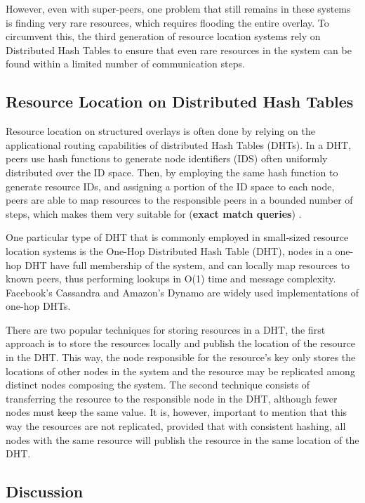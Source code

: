However, even with super-peers, one problem that still remains in these systems is finding very rare resources, which requires flooding the entire overlay. To circumvent this, the third generation of resource location systems rely on Distributed Hash Tables to ensure that even rare resources in the system can be found within a limited number of communication steps.

\subsection{Resource Location on Distributed Hash Tables}

Resource location on structured overlays is often done by relying on the applicational routing capabilities of distributed Hash Tables (DHTs). In a DHT, peers use hash functions to generate node identifiers (IDS) often uniformly distributed over the ID space. Then, by employing the same hash function to generate resource IDs, and assigning a portion of the ID space to each node, peers are able to map resources to the responsible peers in a bounded number of steps, which makes them very suitable for (\textbf{exact match queries}) \cite{leitaoPHDthesis}. 

One particular type of DHT that is commonly employed in small-sized resource location systems is the One-Hop Distributed Hash Table (DHT), nodes in a one-hop DHT have full membership of the system, and can locally map resources to known peers, thus performing lookups in O(1) time and message complexity. Facebook's Cassandra \cite{lakshman2010cassandra} and Amazon's Dynamo \cite{decandia2007dynamo} are widely used implementations of one-hop DHTs. 

There are two popular techniques for storing resources in a DHT, the first approach is to store the resources locally and publish the location of the resource in the DHT. This way, the node responsible for the resource's key only stores the locations of other nodes in the system and the resource may be replicated among distinct nodes composing the system. The second technique consists of transferring the resource to the responsible node in the DHT, although fewer nodes must keep the same value. It is, however, important to mention that this way the resources are not replicated, provided that with consistent hashing, all nodes with the same resource will publish the resource in the same location of the DHT.

\subsection{Discussion}

